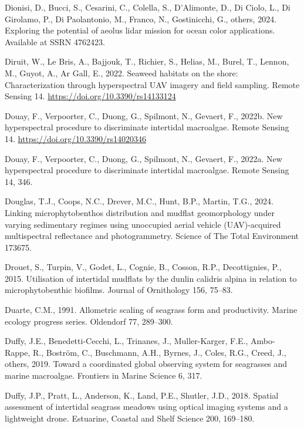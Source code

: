 \documentclass[
  letterpaper,
  11pt,
  english,
  singlespacing,
  headsepline]{MastersDoctoralThesis}
\newlength{\cslhangindent}
\newenvironment{CSLReferences}[2] %
 {\begin{list}{}{%
  \setlength{\itemindent}{0pt}
  \setlength{\leftmargin}{0pt}
  \setlength{\parsep}{0pt}
  \ifodd #1
   \setlength{\leftmargin}{\cslhangindent}
   \setlength{\itemindent}{-1\cslhangindent}
  \fi
  \setlength{\itemsep}{#2\baselineskip}}}
 {\end{list}}
\begin{document}
\begin{CSLReferences}{1}{0}
Dionisi, D., Bucci, S., Cesarini, C., Colella, S., D'Alimonte, D., Di
Ciolo, L., Di Girolamo, P., Di Paolantonio, M., Franco, N., Gostinicchi,
G., others, 2024. Exploring the potential of aeolus lidar mission for
ocean color applications. Available at SSRN 4762423.

Diruit, W., Le Bris, A., Bajjouk, T., Richier, S., Helias, M., Burel,
T., Lennon, M., Guyot, A., Ar Gall, E., 2022. Seaweed habitats on the
shore: Characterization through hyperspectral UAV imagery and field
sampling. Remote Sensing 14. \url{https://doi.org/10.3390/rs14133124}

Douay, F., Verpoorter, C., Duong, G., Spilmont, N., Gevaert, F., 2022b.
New hyperspectral procedure to discriminate intertidal macroalgae.
Remote Sensing 14. \url{https://doi.org/10.3390/rs14020346}

Douay, F., Verpoorter, C., Duong, G., Spilmont, N., Gevaert, F., 2022a.
New hyperspectral procedure to discriminate intertidal macroalgae.
Remote Sensing 14, 346.

Douglas, T.J., Coops, N.C., Drever, M.C., Hunt, B.P., Martin, T.G.,
2024. Linking microphytobenthos distribution and mudflat geomorphology
under varying sedimentary regimes using unoccupied aerial vehicle
(UAV)-acquired multispectral reflectance and photogrammetry. Science of
The Total Environment 173675.

Drouet, S., Turpin, V., Godet, L., Cognie, B., Cosson, R.P.,
Decottignies, P., 2015. Utilisation of intertidal mudflats by the dunlin
calidris alpina in relation to microphytobenthic biofilms. Journal of
Ornithology 156, 75--83.

Duarte, C.M., 1991. Allometric scaling of seagrass form and
productivity. Marine ecology progress series. Oldendorf 77, 289--300.

Duffy, J.E., Benedetti-Cecchi, L., Trinanes, J., Muller-Karger, F.E.,
Ambo-Rappe, R., Boström, C., Buschmann, A.H., Byrnes, J., Coles, R.G.,
Creed, J., others, 2019. Toward a coordinated global observing system
for seagrasses and marine macroalgae. Frontiers in Marine Science 6,
317.

Duffy, J.P., Pratt, L., Anderson, K., Land, P.E., Shutler, J.D., 2018.
Spatial assessment of intertidal seagrass meadows using optical imaging
systems and a lightweight drone. Estuarine, Coastal and Shelf Science
200, 169--180.


\end{CSLReferences}
\end{document}
